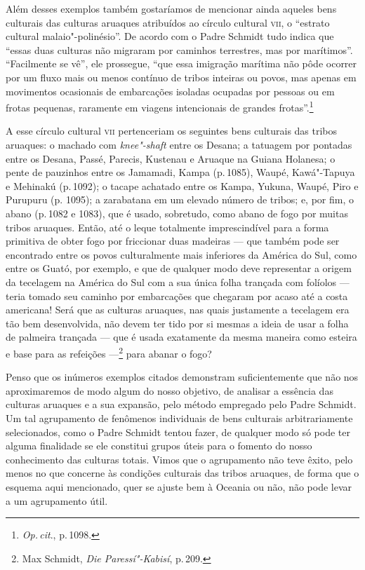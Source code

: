 Além desses exemplos também gostaríamos de mencionar ainda aqueles bens
culturais das culturas aruaques atribuídos ao círculo cultural \textsc{vii}, o
``estrato cultural malaio"-polinésio''. De acordo com o Padre Schmidt
tudo indica que ``essas duas culturas não migraram por caminhos
terrestres, mas por marítimos''. ``Facilmente se vê'', ele prossegue,
``que essa imigração marítima não pôde ocorrer por um fluxo mais ou
menos contínuo de tribos inteiras ou povos, mas apenas em movimentos
ocasionais de embarcações isoladas ocupadas por pessoas ou em frotas
pequenas, raramente em viagens intencionais de grandes
frotas''.\footnote{\textit{Op.\,cit}., p.\,1098.}

A esse círculo cultural \textsc{vii} pertenceriam os seguintes bens culturais das
tribos aruaques: o machado com \textit{knee"-shaft}
entre os Desana; a tatuagem por pontadas entre os Desana, Passé, Parecis,
Kustenau e Aruaque na Guiana Holanesa; o pente de pauzinhos entre os
Jamamadi, Kampa (p.\,1085), Waupé, Kawá"-Tapuya e Mehinakú (p.\,1092); o
tacape achatado entre os Kampa, Yukuna, Waupé, Piro e Purupuru (p.
1095); a zarabatana em um elevado número de tribos; e, por fim, o abano
(p.\,1082 e 1083), que é usado, sobretudo, como abano de fogo por muitas
tribos aruaques. Então, até o leque totalmente imprescindível para a
forma primitiva de obter fogo por friccionar duas madeiras ---
que também pode ser encontrado entre os
povos culturalmente mais inferiores da América do Sul, como entre os
Guató, por exemplo, e que de qualquer modo deve representar a origem da
tecelagem na América do Sul com a sua única folha trançada com folíolos
--- teria tomado seu caminho por embarcações que chegaram por acaso até a
costa americana! Será que as culturas aruaques, nas quais justamente a
tecelagem era tão bem desenvolvida, não devem ter tido por si mesmas a
ideia de usar a folha de palmeira trançada --- que é usada exatamente da
mesma maneira como esteira e base para as refeições ---\footnote{Max
  Schmidt, \textit{Die Paressí"-Kabisí}, p.\,209.}  para abanar o
fogo?


Penso que os inúmeros exemplos citados demonstram suficientemente que
não nos aproximaremos de modo algum do nosso objetivo, de analisar a
essência das culturas aruaques e a sua expansão, pelo método empregado
pelo Padre Schmidt. Um tal agrupamento de fenômenos individuais de bens
culturais arbitrariamente selecionados, como o Padre Schmidt tentou
fazer, de qualquer modo só pode ter alguma finalidade se ele constitui
grupos úteis para o fomento do nosso conhecimento das culturas totais.
Vimos que o agrupamento não teve êxito, pelo menos no que concerne às
condições culturais das tribos aruaques, de forma que o esquema aqui
mencionado, quer se ajuste bem à Oceania ou não, não pode levar a um
agrupamento útil.

